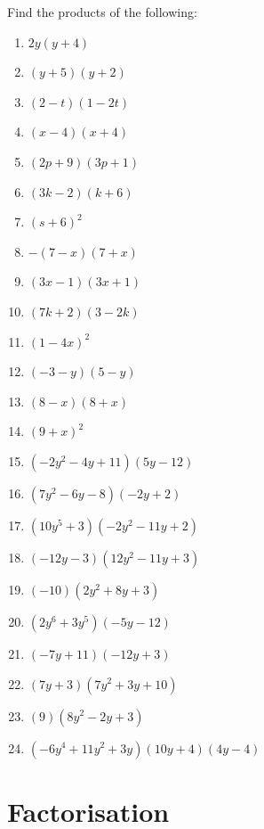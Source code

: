 \begin{exercises}{}
Find the products of the following:

\begin{multicols}{2}
\begin{enumerate}[label=\textbf{\arabic*}., itemsep=5pt]
\item $2y(y+4)$ 
\item $(y+5)(y+2) $
\item $(2-t)(1-2t)$
\item $(x-4)(x+4)$
\item $ (2p+9)(3p+1)$
\item $(3k-2)(k+6)$
\item $(s+6)^2$
\item $-(7-x)(7+x)$
\item $(3x-1)(3x+1)$
\item $(7k+2)(3-2k)$
\item $(1-4x)^2$
\item $(-3-y)(5-y)$
\item $(8-x)(8+x)$
\item $(9+x)^2$
\item$\left(-2{y}^{2}-4y+11\right)\left(5y-12\right)$ 
\item$\left(7{y}^{2}-6y-8\right)\left(-2y+2\right)$%
\item$\left(10{y}^{5}+3\right)\left(-2{y}^{2}-11y+2\right)$ 
\item$\left(-12y-3\right)\left(12{y}^{2}-11y+3\right)$%
\item$\left(-10\right)\left(2{y}^{2}+8y+3\right)$ 
\item$\left(2{y}^{6}+3{y}^{5}\right)\left(-5y-12\right)$%
\item$\left(-7y+11\right)\left(-12y+3\right)$%
\item$\left(7y+3\right)\left(7{y}^{2}+3y+10\right)$%
\item$\left(9\right)\left(8{y}^{2}-2y+3\right)$ 
\item$\left(-6{y}^{4}+11{y}^{2}+3y\right)\left(10y+4\right)\left(4y-4\right)$ 
\end{enumerate}
\end{multicols}
\end{exercises}





\section{Factorisation}

